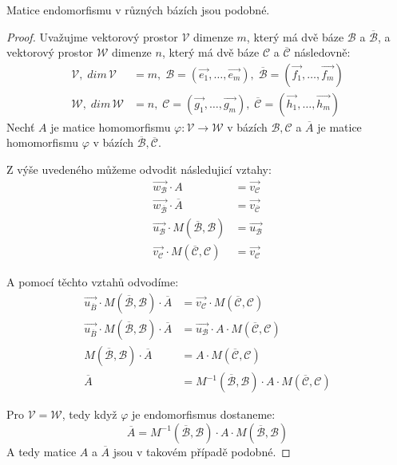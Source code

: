 \begin{theorem}
    Matice endomorfismu v různých bázích jsou podobné.
\end{theorem}
\begin{proof}
    Uvažujme vektorový prostor $\mathcal{V}$ dimenze $m$, který má dvě báze $\mathcal{B}$ a $\overline{\mathcal{B}}$,
    a vektorový prostor $\mathcal{W}$ dimenze $n$, který má dvě báze $\mathcal{C}$ a $\overline{\mathcal{C}}$ následovně:
    \begin{align*}
        \mathcal{V}, \; dim\,\mathcal{V} &= m, \; \mathcal{B} = (\vec{e_1}, \ldots, \vec{e_m}),\; \overline{\mathcal{B}} = (\vec{f_1}, \ldots, \vec{f_m})\\
        \mathcal{W}, \; dim\,\mathcal{W} &= n, \; \mathcal{C} = (\vec{g_1}, \ldots, \vec{g_m}),\; \overline{\mathcal{C}} = (\vec{h_1}, \ldots, \vec{h_m})
    \end{align*}
    Nechť $A$ je matice homomorfismu $\varphi: \mathcal{V} \rightarrow \mathcal{W}$ v bázích $\mathcal{B}, \mathcal{C}$
    a $\overline{A}$ je matice homomorfismu $\varphi$ v bázích $\overline{\mathcal{B}}, \overline{\mathcal{C}}$.

    Z výše uvedeného můžeme odvodit následujicí vztahy:
    \begin{align*}
        \vec{w_{\mathcal{B}}} \cdot A & = \vec{v_{\mathcal{C}}}\\
        \vec{w_{\overline{\mathcal{B}}}} \cdot \overline{A} & = \vec{v_{\overline{\mathcal{C}}}}\\
        \vec{u_{\mathcal{B}}} \cdot M(\overline{\mathcal{B}}, \mathcal{B}) & = \vec{u_{\mathcal{B}}}\\
        \vec{v_{\mathcal{C}}} \cdot M(\overline{\mathcal{C}}, \mathcal{C}) & = \vec{v_{\mathcal{C}}}
    \end{align*}

    A pomocí těchto vztahů odvodíme: 
    \begin{align*}
        \vec{u_{\overline{B}}} \cdot M(\overline{\mathcal{B}}, \mathcal{B}) \cdot \overline{A} 
            &= \vec{v_{\mathcal{C}}} \cdot M(\overline{\mathcal{C}}, \mathcal{C})\\ 
        \vec{u_{\overline{B}}} \cdot M(\overline{\mathcal{B}}, \mathcal{B}) \cdot \overline{A} 
            &= \vec{u_{\mathcal{B}}} \cdot A \cdot M(\overline{\mathcal{C}}, \mathcal{C}) \\
        M(\overline{\mathcal{B}}, \mathcal{B}) \cdot \overline{A} &= 
            A \cdot M(\overline{\mathcal{C}}, \mathcal{C})\\ 
        \overline{A} &= 
            M^{-1}(\overline{\mathcal{B}}, \mathcal{B}) \cdot A \cdot M(\overline{\mathcal{C}}, \mathcal{C})
    \end{align*}

    Pro $\mathcal{V} = \mathcal{W}$, tedy když $\varphi$ je endomorfismus dostaneme:
    $$\overline{A} = M^{-1}(\overline{\mathcal{B}}, \mathcal{B}) \cdot A \cdot M(\overline{\mathcal{B}}, \mathcal{B})$$
    A tedy matice $A$ a $\overline{A}$ jsou v takovém případě podobné.
\end{proof}


